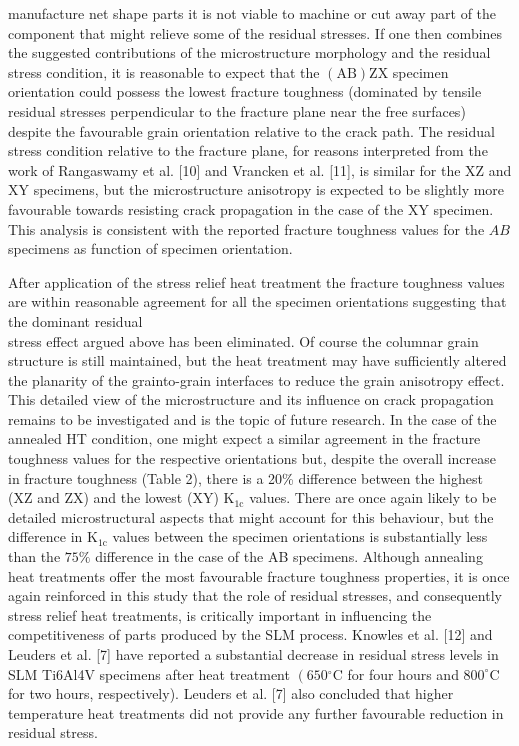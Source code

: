 \documentclass[10pt]{article}
\begin{document}
manufacture net shape parts it is not viable to machine or cut away part of the component that might relieve some of the residual stresses. If one then combines the suggested contributions of the microstructure morphology and the residual stress condition, it is reasonable to expect that the $(\mathrm{AB}) \mathrm{ZX}$ specimen orientation could possess the lowest fracture toughness (dominated by tensile residual stresses perpendicular to the fracture plane near the free surfaces) despite the favourable grain orientation relative to the crack path. The residual stress condition relative to the fracture plane, for reasons interpreted from the work of Rangaswamy et al. [10] and Vrancken et al. [11], is similar for the XZ and XY specimens, but the microstructure anisotropy is expected to be slightly more favourable towards resisting crack propagation in the case of the XY specimen. This analysis is consistent with the reported fracture toughness values for the $A B$ specimens as function of specimen orientation.

After application of the stress relief heat treatment the fracture toughness values are within reasonable agreement for all the specimen orientations suggesting that the dominant residual\\
stress effect argued above has been eliminated. Of course the columnar grain structure is still maintained, but the heat treatment may have sufficiently altered the planarity of the grainto-grain interfaces to reduce the grain anisotropy effect. This detailed view of the microstructure and its influence on crack propagation remains to be investigated and is the topic of future research. In the case of the annealed HT condition, one might expect a similar agreement in the fracture toughness values for the respective orientations but, despite the overall increase in fracture toughness (Table 2), there is a 20\% difference between the highest (XZ and ZX) and the lowest (XY) $\mathrm{K}_{1 \mathrm{c}}$ values. There are once again likely to be detailed microstructural aspects that might account for this behaviour, but the difference in $\mathrm{K}_{1 \mathrm{c}}$ values between the specimen orientations is substantially less than the $75 \%$ difference in the case of the AB specimens. Although annealing heat treatments offer the most favourable fracture toughness properties, it is once again reinforced in this study that the role of residual stresses, and consequently stress relief heat treatments, is critically important in influencing the competitiveness of parts produced by the SLM process. Knowles et al. [12] and Leuders et al. [7] have reported a substantial decrease in residual stress levels in SLM Ti6Al4V specimens after heat treatment $\left(650{ }^{\circ} \mathrm{C}\right.$ for four hours and $800^{\circ} \mathrm{C}$ for two hours, respectively). Leuders et al. [7] also concluded that higher temperature heat treatments did not provide any further favourable reduction in residual stress.
\end{document}
